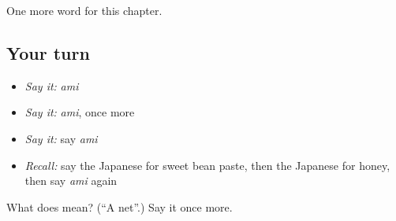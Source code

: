 \begin{grammarlens}[title={What you've built}]
One more word for this chapter.
\end{grammarlens}

\subsection*{Your turn}
\begin{itemize}
\raggedright
  \item \emph{Say it:} \emph{ami}
  \item \emph{Say it:} \emph{ami}, once more
  \item \emph{Say it:} say \emph{ami}
  \item \emph{Recall:} say the Japanese for sweet bean paste, then the Japanese for honey, then say \emph{ami} again
\end{itemize}

\begin{tcolorbox}[breakable,colback=teal!4,colframe=teal!35!black,title={Before you move on}]
What does  mean? (\textquotedblleft{}A net\textquotedblright{}.) Say it once more.
\end{tcolorbox}
